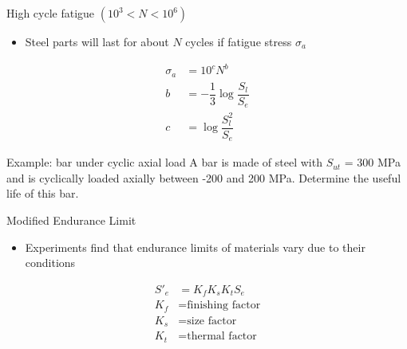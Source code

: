 \documentclass[10pt, svgnames]{beamer}
\begin{document}
\begin{frame}[label={sec:orgdaa778e}]{High cycle fatigue \((10^3 < N < 10^6)\)}
\begin{itemize}
\item Steel parts will last for about \(N\) cycles if fatigue stress \(\sigma_a\)
\end{itemize}

\begin{align*}
  \sigma_a &= 10^c N^b \\
  b &= -\dfrac{1}{3}   \log\dfrac{S_l}{S_e} \\
  c &= \log \dfrac{S_l^2}{S_e}
\end{align*}
\end{frame}


\begin{frame}[label={sec:org46843f7}]{Example: bar under cyclic axial load}
A bar is made of steel with \(S_{ut}\) = 300 MPa and is cyclically loaded axially between -200 and 200 MPa. Determine the useful life of this bar.
\end{frame}



\begin{frame}[label={sec:org9c4f726}]{Modified Endurance Limit}
\begin{itemize}
\item Experiments find that endurance limits of materials vary due to their conditions
\end{itemize}

\begin{align*}
  S'_e &= K_f K_s K_t S_e  \\[10pt]
  K_f &= \text{finishing factor} \\
  K_s &= \text{size factor} \\
  K_t &= \text{thermal factor}
\end{align*}
\end{frame}
\end{document}
